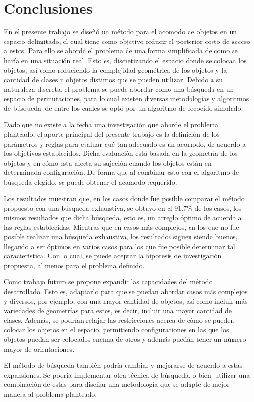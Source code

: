 \chapter{Conclusiones}\label{chap:conclusiones}
%
%
En el presente trabajo se diseñó un método para el acomodo de objetos en un espacio delimitado, el cual tiene como objetivo reducir el posterior costo de acceso a estos.
Para ello se abordó el problema de una forma simplificada de como se haría en una situación real.
Esto es, discretizando el espacio donde se colocan los objetos, así como reduciendo la complejidad geométrica de los objetos y la cantidad de clases u objetos distintos que se pueden utilizar.
Debido a su naturaleza discreta, el problema se puede abordar como una búsqueda en un espacio de permutaciones, para lo cual existen diversas metodologías y algoritmos de búsqueda, de entre los cuales se optó por un algoritmo de recocido simulado.

Dado que no existe a la fecha una investigación que aborde el problema planteado, el aporte principal del presente trabajo es la definición de los parámetros y reglas para evaluar qué tan adecuado es un acomodo, de acuerdo a los objetivos establecidos.
Dicha evaluación está basada en la geometría de los objetos y en cómo esta afecta su sujeción cuando los objetos están en determinada configuración.
De forma que al combinar esto con el algoritmo de búsqueda elegido, se puede obtener el acomodo requerido.

Los resultados muestran que, en los casos donde fue posible comparar el método propuesto con una búsqueda exhaustiva, se obtuvo en el 91.7\% de los casos, los mismos resultados que dicha búsqueda, esto es, un arreglo óptimo de acuerdo a las reglas establecidas.
Mientras que en casos más complejos, en los que no fue posible realizar una búsqueda exhaustiva, los resultados siguen siendo buenos, llegando a ser óptimos en varios casos para los que fue posible determinar tal característica.
Con lo cual, se puede aceptar la hipótesis de investigación propuesta, al menos para el problema definido.

Como trabajo futuro se propone expandir las capacidades del método desarrollado.
Esto es, adaptarlo para que se puedan abordar casos más complejos y diversos, por ejemplo, con una mayor cantidad de objetos, así como incluir más variedades de geometrías para estos, es decir, incluir una mayor cantidad de clases.
Además, se podrían relajar las restricciones acerca de cómo se pueden colocar los objetos en el espacio, permitiendo configuraciones en las que los objetos puedan ser colocados encima de otros y además puedan tener un número mayor de orientaciones.

El método de búsqueda también podría cambiar y mejorarse de acuerdo a estas expansiones.
Se podría implementar otra técnica de búsqueda, o bien, utilizar una combinación de estas para diseñar una metodología que se adapte de mejor manera al problema planteado.